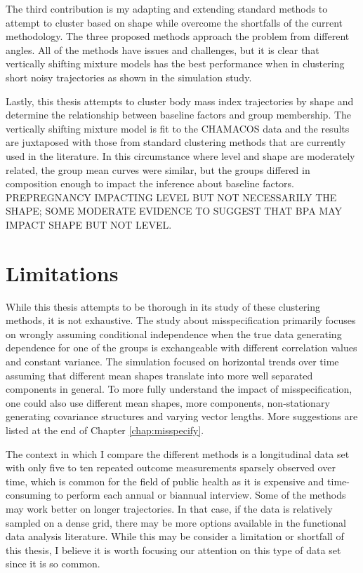 The third contribution is my adapting and extending standard methods to attempt to cluster based on shape while overcome the shortfalls of the current methodology. The three proposed methods approach the problem from different angles. All of the methods have issues and challenges, but it is clear that vertically shifting mixture models has the best performance when in clustering short noisy trajectories as shown in the simulation study.

Lastly, this thesis attempts to cluster body mass index trajectories by shape and determine the relationship between baseline factors and group membership. The vertically shifting mixture model is fit to the CHAMACOS data and the results are juxtaposed with those from standard clustering methods that are currently used in the literature. In this circumstance where level and shape are moderately related, the group mean curves were similar, but the groups differed in composition enough to impact the inference about baseline factors. PREPREGNANCY IMPACTING LEVEL BUT NOT NECESSARILY THE SHAPE; SOME MODERATE EVIDENCE TO SUGGEST THAT BPA MAY IMPACT SHAPE BUT NOT LEVEL. 

\section{Limitations}
While this thesis attempts to be thorough in its study of these clustering methods, it is not exhaustive. The study about misspecification primarily focuses on wrongly assuming conditional independence when the true data generating dependence for one of the groups is exchangeable with different correlation values and constant variance. The simulation focused on horizontal trends over time assuming that different mean shapes translate into more well separated components in general. To more fully understand the impact of misspecification, one could also use different mean shapes, more components, non-stationary generating covariance structures and varying vector lengths. More suggestions are listed at the end of Chapter \ref{chap:misspecify}. 

The context in which I compare the different methods is a longitudinal data set with only five to ten repeated outcome measurements sparsely observed over time, which is common for the field of public health as it is expensive and time-consuming to perform each annual or biannual interview. Some of the methods may work better on longer trajectories. In that case, if the data is relatively sampled on a dense grid, there may be more options available in the functional data analysis literature. While this may be consider a limitation or shortfall of this thesis, I believe it is worth focusing our attention on this type of data set since it is so common.

